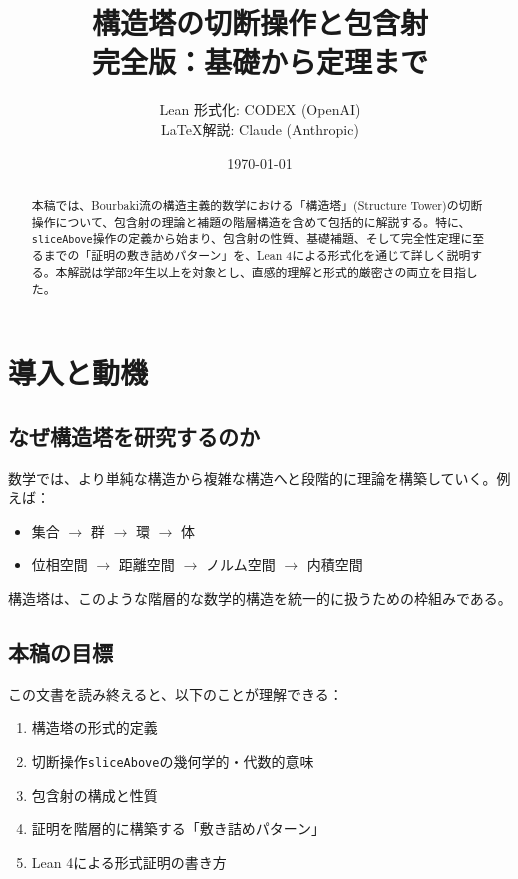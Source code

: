 \documentclass[a4paper,11pt]{article}
\title{構造塔の切断操作と包含射\\{\large 完全版：基礎から定理まで}}
\author{%
    Lean 形式化: CODEX (OpenAI)\\
    \LaTeX 解説: Claude (Anthropic)
}
\date{\today}
\theoremstyle{definition}
\begin{document}
\maketitle

\begin{abstract}
本稿では、Bourbaki流の構造主義的数学における「構造塔」(Structure Tower)の切断操作について、包含射の理論と補題の階層構造を含めて包括的に解説する。特に、\texttt{sliceAbove}操作の定義から始まり、包含射の性質、基礎補題、そして完全性定理に至るまでの「証明の敷き詰めパターン」を、Lean 4による形式化を通じて詳しく説明する。本解説は学部2年生以上を対象とし、直感的理解と形式的厳密さの両立を目指した。
\end{abstract}

\tableofcontents
\newpage

\section{導入と動機}

\subsection{なぜ構造塔を研究するのか}

数学では、より単純な構造から複雑な構造へと段階的に理論を構築していく。例えば：
\begin{itemize}
    \item 集合 $\to$ 群 $\to$ 環 $\to$ 体
    \item 位相空間 $\to$ 距離空間 $\to$ ノルム空間 $\to$ 内積空間
\end{itemize}

構造塔は、このような階層的な数学的構造を統一的に扱うための枠組みである。

\subsection{本稿の目標}

この文書を読み終えると、以下のことが理解できる：
\begin{enumerate}
    \item 構造塔の形式的定義
    \item 切断操作\texttt{sliceAbove}の幾何学的・代数的意味
    \item 包含射の構成と性質
    \item 証明を階層的に構築する「敷き詰めパターン」
    \item Lean 4による形式証明の書き方
\end{enumerate}
\end{document}
